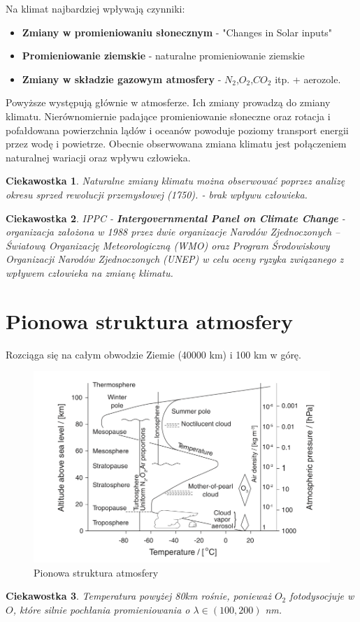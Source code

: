 \documentclass{article}
\theoremstyle{plain}
\newtheorem{ciekaw}{Ciekawostka}
\begin{document}
Na klimat najbardziej wpływają czynniki:
\begin{itemize}
	\item \textbf{Zmiany w promieniowaniu słonecznym} - "Changes in Solar inputs"
	\item \textbf{Promieniowanie ziemskie} - naturalne promieniowanie ziemskie
	\item \textbf{Zmiany w składzie gazowym atmosfery} - $N_2$,$O_2$,$CO_2$ itp. + aerozole.
\end{itemize}
Powyższe występują głównie w atmosferze. Ich zmiany prowadzą do zmiany klimatu. Nierównomiernie padające promieniowanie słoneczne oraz rotacja i pofałdowana powierzchnia lądów i oceanów  powoduje poziomy transport energii przez wodę i powietrze. Obecnie obserwowana zmiana klimatu jest połączeniem naturalnej wariacji oraz wpływu człowieka.
\begin{ciekaw}
	Naturalne zmiany klimatu można obserwować poprzez analizę okresu sprzed rewolucji przemysłowej (1750). - brak wpływu człowieka.
\end{ciekaw}
\begin{ciekaw}
IPPC - \textbf{Intergovernmental Panel on Climate Change} - organizacja założona w 1988 przez dwie organizacje Narodów Zjednoczonych – Światową Organizację Meteorologiczną (WMO) oraz Program Środowiskowy Organizacji Narodów Zjednoczonych (UNEP) w celu oceny ryzyka związanego z wpływem człowieka na zmianę klimatu.	
\end{ciekaw}
\section{Pionowa struktura atmosfery}
Rozciąga się na całym obwodzie Ziemie (40000 km) i 100 km w górę.
\begin{figure}[h]
\begin{center}
	\includegraphics[width=0.7\linewidth]{images/Figure2}
	\caption{Pionowa struktura atmosfery}
\end{center}
\end{figure}
\begin{ciekaw}
	Temperatura powyżej 80km rośnie, ponieważ $O_2$ fotodysocjuje w $O$, które silnie pochłania promieniowania o $\lambda \in(100,200)$ nm.	
\end{ciekaw}
\end{document}
